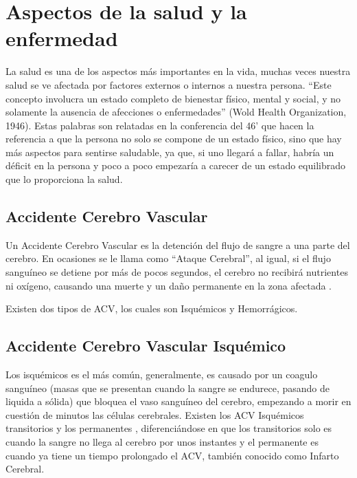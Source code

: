 \doublespacing
\section{Aspectos de la salud y la enfermedad}
La salud es una de los aspectos más importantes en la vida, muchas veces nuestra salud se ve afectada por factores externos o internos a nuestra persona. “Este concepto involucra un estado completo de bienestar físico, mental y social, y no solamente la ausencia de afecciones o enfermedades” (Wold Health Organization, 1946). Estas palabras son relatadas en la conferencia del 46’ que hacen la referencia a que la persona no solo se compone de un estado físico, sino que hay más aspectos para sentirse saludable, ya que, si uno llegará a fallar, habría un déficit en la persona y poco a poco empezaría a carecer de un estado equilibrado que lo proporciona la salud. \\

\doublespacing
\subsection{Accidente Cerebro Vascular}
\par Un Accidente Cerebro Vascular es la detención del flujo de sangre a una parte del cerebro. En ocasiones se le llama como “Ataque Cerebral”, al igual, si el flujo sanguíneo se detiene por más de pocos segundos, el cerebro no recibirá nutrientes ni oxígeno, causando una muerte y un daño permanente en la zona afectada \cite{Garcia2019}.
\par Existen dos tipos de ACV, los cuales son Isquémicos y Hemorrágicos.\\

\doublespacing
\subsection{Accidente Cerebro Vascular Isquémico}
\par Los isquémicos es el más común, generalmente, es causado por un coagulo sanguíneo (masas que se presentan cuando la sangre se endurece, pasando de liquida a sólida) que bloquea el vaso sanguíneo del cerebro, empezando a morir en cuestión de minutos las células cerebrales. Existen los ACV Isquémicos transitorios y los permanentes \cite{Garcia2019}, diferenciándose en que los transitorios solo es cuando la sangre no llega al cerebro por unos instantes y el permanente es cuando ya tiene un tiempo prolongado el ACV, también conocido como Infarto Cerebral.\\

